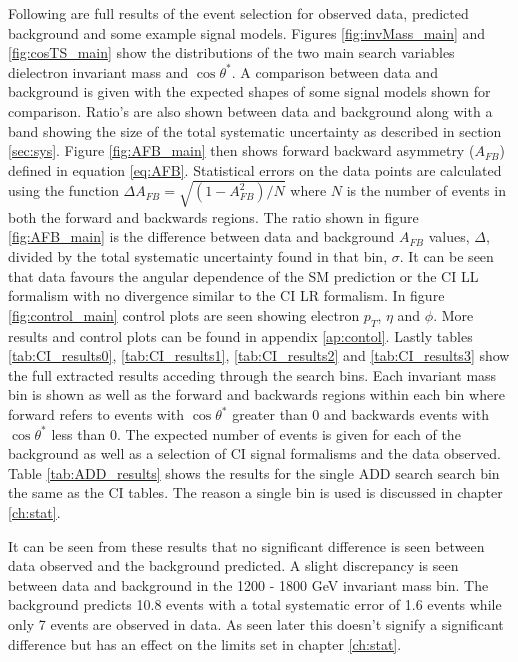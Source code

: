 	Following are full results of the event selection for observed data, predicted background and some example signal models. Figures \ref{fig:invMass_main} and \ref{fig:cosTS_main} show the distributions of the two main search variables dielectron invariant mass and $\cos{\theta^{*}}$. A comparison between data and background is given with the expected shapes of some signal models shown for comparison. Ratio's are also shown between data and background along with a band showing the size of the total systematic uncertainty as described in section \ref{sec:sys}. Figure \ref{fig:AFB_main} then shows forward backward asymmetry ($A_{FB}$) defined in equation \ref{eq:AFB}. Statistical errors on the data points are calculated using the function $\Delta A_{FB} = \sqrt{(1-A_{FB}^{2})/N}$ where $N$ is the number of events in both the forward and backwards regions. The ratio shown in figure \ref{fig:AFB_main} is the difference between data and background $A_{FB}$ values, $\Delta$, divided by the total systematic uncertainty found in that bin, $\sigma$. It can be seen that data favours the angular dependence of the SM prediction or the CI LL formalism with no divergence similar to the CI LR formalism. 
	In figure \ref{fig:control_main} control plots are seen showing electron $p_{T}$, $\eta$ and $\phi$. More results and control plots can be found in appendix \ref{ap:contol}. 
	Lastly tables \ref{tab:CI_results0}, \ref{tab:CI_results1}, \ref{tab:CI_results2} and \ref{tab:CI_results3} show the full extracted results acceding through the search bins. Each invariant mass bin is shown as well as the forward and backwards regions within each bin where forward refers to events with $\cos{\theta^{*}}$ greater than 0 and backwards events with $\cos{\theta^{*}}$ less than 0. The expected number of events is given for each of the background as well as a selection of CI signal formalisms and the data observed. Table \ref{tab:ADD_results} shows the results for the single ADD search search bin the same as the CI tables. The reason a single bin is used is discussed in chapter \ref{ch:stat}.

	It can be seen from these results that no significant difference is seen between data observed and the background predicted. A slight discrepancy is seen between data and background in the 1200 - 1800 GeV invariant mass bin. The background predicts 10.8 events with a total systematic error of 1.6 events while only 7 events are observed in data. As seen later this doesn't signify a significant difference but has an effect on the limits set in chapter \ref{ch:stat}. 



